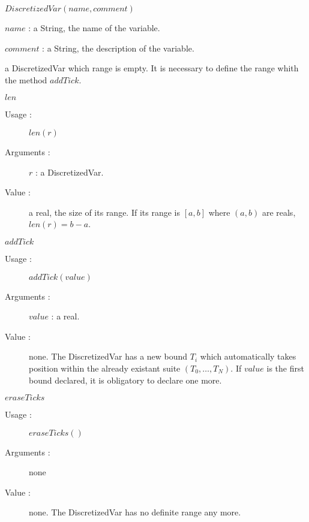 \begin{description}
\item[Usage :]  $DiscretizedVar(name, comment)$

\item[Arguments :] \strut
  \begin{description}
  \item $name$ : a String, the name of the variable.
  \item $comment$ : a String, the description of the variable.
  \end{description}

\item[Value :]    a  DiscretizedVar which range is empty. It is necessary to define the range whith the method $addTick$.

\item[Some methods :]  \strut

  \begin{description}

  \item $len$
    \begin{description}
    \item[Usage :]  $len(r)$
    \item[Arguments :] $r$ : a DiscretizedVar.
    \item[Value :]  a real, the size of its range. If its range is $[a,b]$ where $(a,b)$ are reals, $len(r) = b-a$.
    \end{description}
    \bigskip

  \item $addTick$
    \begin{description}
    \item[Usage :]  $addTick(value)$
    \item[Arguments :] $value$ : a real.
    \item[Value :]  none. The DiscretizedVar has a new bound $T_i$ which automatically  takes position within the already existant suite $(T_0, \hdots, T_N)$. If $value$ is the first bound declared, it is obligatory to declare one more.
    \end{description}
    \bigskip

  \item $eraseTicks$
    \begin{description}
    \item[Usage :]  $eraseTicks()$
    \item[Arguments :] none
    \item[Value :]  none. The DiscretizedVar has no definite range any more.
    \end{description}
    \bigskip


\end{description}
\end{description}
